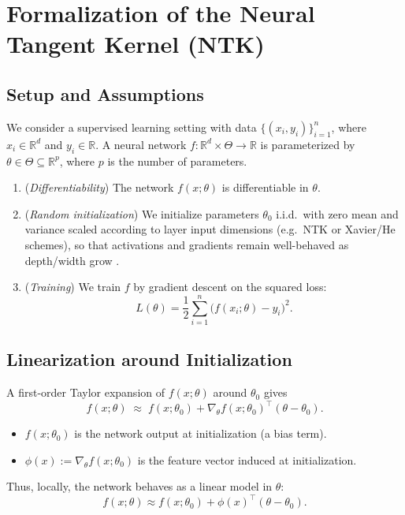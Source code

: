 \section{Formalization of the Neural Tangent Kernel (NTK)}\label{sec:ntk-formalization}

\subsection{Setup and Assumptions}

We consider a supervised learning setting with data $\{(x_i,y_i)\}_{i=1}^n$,
where $x_i \in \mathbb{R}^d$ and $y_i \in \mathbb{R}$. A neural network
$f:\mathbb{R}^d \times \Theta \to \mathbb{R}$ is parameterized by $\theta \in
	\Theta \subseteq \mathbb{R}^p$, where $p$ is the number of parameters.

\begin{assumption}\label{ass:model}
	\leavevmode
	\begin{enumerate}
		\item (\emph{Differentiability}) The network $f(x ;\theta)$ is differentiable in $\theta$.
		\item (\emph{Random initialization}) We initialize parameters $\theta_0$ i.i.d.\ with zero mean and variance scaled according to layer input dimensions (e.g.\ NTK or Xavier/He schemes), so that activations and gradients remain well-behaved as depth/width grow \citep{neal1996priors, jacot2018ntk, lee2019wide}.
		\item (\emph{Training})
		      We train $f$ by gradient descent on the squared loss:
		      \[
			      L(\theta) = \frac{1}{2}\sum_{i=1}^n \big(f(x_i;\theta) - y_i\big)^2.
		      \]
	\end{enumerate}
\end{assumption}


\subsection{Linearization around Initialization}

A first-order Taylor expansion of $f(x;\theta)$ around $\theta_0$ gives
\[
	f(x;\theta) \;\approx\; f(x;\theta_0) + \nabla_\theta f(x;\theta_0)^\top (\theta - \theta_0).
\]
\begin{itemize}
	\item $f(x;\theta_0)$ is the network output at initialization (a bias term).
	\item $\phi(x) := \nabla_\theta f(x;\theta_0)$ is the feature vector induced at initialization.
\end{itemize}
Thus, locally, the network behaves as a linear model in $\theta$:
\[
	f(x;\theta) \approx f(x;\theta_0) + \phi(x)^\top (\theta - \theta_0).
\]


